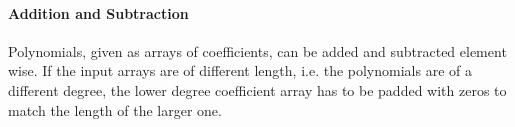 

\paragraph{Addition and Subtraction}
Polynomials, given as arrays of coefficients, can be added and subtracted element wise. If the input arrays are of different length, i.e. the polynomials are of a different degree, the lower degree coefficient array has to be padded with zeros to match the length of the larger one.


